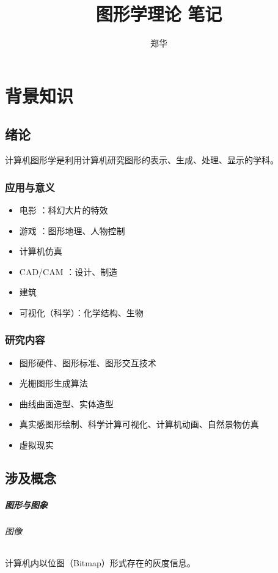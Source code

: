 \documentclass[UTF8,a4paper,12pt]{ctexbook}
\author{\kaishu 郑华}
\title{\heiti 图形学理论 笔记}
\begin{document}
 	\maketitle
 	\tableofcontents
 		
\chapter{背景知识}
	\section{绪论}
		计算机图形学是利用计算机研究图形的表示、生成、处理、显示的学科。
		
		\subsection{应用与意义}
			\begin{itemize}
				\item 电影 ：科幻大片的特效
				\item 游戏 ：图形地理、人物控制
				\item 计算机仿真
				\item CAD/CAM ：设计、制造
	 			\item 建筑
				\item 可视化（科学）：化学结构、生物
			\end{itemize}	
	
		\subsection{研究内容}
			\begin{itemize}
				\item 图形硬件、图形标准、图形交互技术
				\item 光栅图形生成算法
				\item 曲线曲面造型、实体造型
				\item 真实感图形绘制、科学计算可视化、计算机动画、自然景物仿真
				\item 虚拟现实
			\end{itemize}
			
	\section{涉及概念}
		\paragraph{图形与图象}
			\subparagraph{图像}
				计算机内以位图（Bitmap）形式存在的灰度信息。
		
\end{document}
